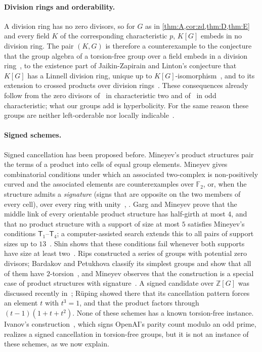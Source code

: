 \documentclass[11pt]{article}
\theoremstyle{definition}
\theoremstyle{plain}
\newcommand{\F}{\mathbb{F}}
\newcommand{\Z}{\mathbb{Z}}
\begin{document}
\paragraph{Division rings and orderability.} A division ring has no zero divisors, so for $G$ as in \cref{thm:A,cor:zd,thm:D,thm:E} and every field $K$ of the corresponding characteristic $p$, $K[G]$ embeds in no division ring. The pair $(K,G)$ is therefore a counterexample to the conjecture that the group algebra of a torsion-free group over a field embeds in a division ring~\cite[Conj.~1.1]{FisherSanchezPeralta2026}, to the existence part of Jaikin-Zapirain and Linton's conjecture that $K[G]$ has a Linnell division ring, unique up to $K[G]$-isomorphism~\cite[Conj.~1]{JZL2025}, and to its extension to crossed products over division rings~\cite[Conj.~1.2]{FisherSanchezPeralta2026}. These consequences already follow from the zero divisors of~\cite{OAI196} in characteristic two and of~\cite{Ivanov2026} in odd characteristic; what our groups add is hyperbolicity. For the same reason these groups are neither left-orderable nor locally indicable~\cite{Higman1940}.

\paragraph{Signed schemes.} Signed cancellation has been proposed before. Mineyev's product structures pair the terms of a product into cells of equal group elements. Mineyev gives combinatorial conditions under which an associated two-complex is non-positively curved and the associated elements are counterexamples over $\F_2$, or, when the structure admits a \emph{signature} (signs that are opposite on the two members of every cell), over every ring with unity~\cite[\S\S2.2, 3.5, 3.6 and Thm.~27]{Mineyev2024}, \cite[Thm.~16]{GargMineyev2025}. Garg and Mineyev prove that the middle link of every orientable product structure has half-girth at most $4$, and that no product structure with a support of size at most $5$ satisfies Mineyev's conditions $\mathsf T_1$--$\mathsf T_4$; a computer-assisted search extends this to all pairs of support sizes up to $13$~\cite[Thms.~1--3]{GargMineyev2025}. Shin shows that these conditions fail whenever both supports have size at least two~\cite{Shin2026}. Rips constructed a series of groups with potential zero divisors; Bardakov and Petukhova classify its simplest groups and show that all of them have $2$-torsion~\cite{BardakovPetukhova2017}, and Mineyev observes that the construction is a special case of product structures with signature~\cite[\S1]{Mineyev2024}. A signed candidate over $\Z[G]$ was discussed recently in~\cite{MO513707}; R\"uping showed there that its cancellation pattern forces an element $t$ with $t^3=1$, and that the product factors through $(t-1)(1+t+t^2)$. None of these schemes has a known torsion-free instance. Ivanov's construction~\cite{Ivanov2026}, which signs OpenAI's parity count modulo an odd prime, realizes a signed cancellation in torsion-free groups, but it is not an instance of these schemes, as we now explain.
\end{document}
